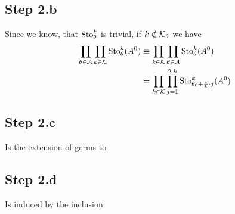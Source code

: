 \subsection{Step 2.b}
Since we know, that $\operatorname{Sto}_{\theta}^k$ is trivial, if $k\notin\mathcal{K}_\theta$ we
have
\begin{align*}
  \prod_{\theta\in\mathcal{A}}\prod_{k\in\mathcal{K}}\operatorname{Sto}_\theta^k(A^0)
  &\equiv \prod_{k\in\mathcal{K}}\prod_{\theta\in\mathcal{A}}\operatorname{Sto}_\theta^k(A^0)
\\&= \prod_{k\in\mathcal{K}} \prod_{j=1}^{2\cdot k}
  \operatorname{Sto}_{\theta_0+\frac{\pi}{k}\cdot j}^k(A^0)
\end{align*}

\subsection{Step 2.c}
Is the extension of germs to \TODO{}

\subsection{Step 2.d}
Is induced by the inclusion \TODO{}


